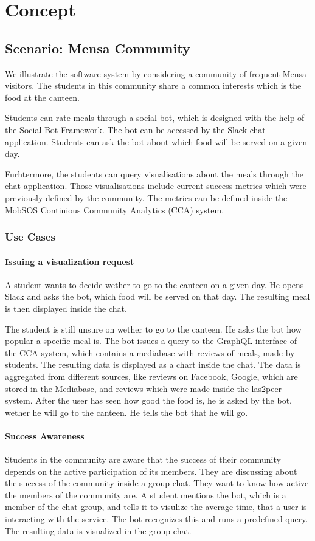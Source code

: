 \chapter{Concept}
\section{Scenario: Mensa Community}
We illustrate the software system by considering a community of frequent Mensa visitors. The students in this community share a common interests which is the food at the canteen.

Students can rate meals through a social bot, which is designed with the help of the Social Bot Framework. The bot can be accessed by the Slack chat application. Students can ask the bot about which food will be served on a given day.

Furhtermore, the students can query visualisations about the meals through the chat application. Those visualisations include current success metrics which were previously defined by the community. The metrics can be defined inside the MobSOS Continious Community Analytics (CCA) system.

\subsection{Use Cases}

\subsubsection{Issuing a visualization request} A student wants to decide wether to go to the canteen on a given day. He opens Slack and asks the bot, which food will be served on that day. The resulting meal is then displayed inside the chat.

The student is still unsure on wether to go to the canteen. He asks the bot how popular a specific meal is. The bot issues a query to the GraphQL interface of the CCA system, which contains a mediabase with reviews of meals, made by students. The resulting data is displayed as a chart inside the chat. The data is aggregated from different sources, like reviews on Facebook, Google, which are stored in the Mediabase, and reviews which were made inside the las2peer system. After the user has seen how good the food is, he is asked by the bot, wether he will go to the canteen. He tells the bot that he will go.

\subsubsection{Success Awareness} Students in the community are aware that the success of their community depends on the active participation of its members. They are discussing about the success of the community inside a group chat. They want to know how active the members of the community are. A student mentions the bot, which is a member of the chat group, and tells it to visulize the  average time, that a user is interacting with the service. The bot recognizes this and runs a predefined query. The resulting data is visualized in the group chat.

